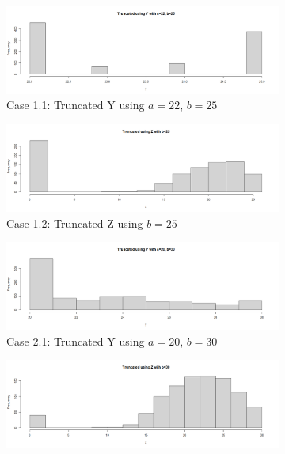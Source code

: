 \documentclass[12pt,letterpaper]{article}
\begin{document}
\begin{enumerate}[label=\Alph*]
       \begin{figure}[H]
         \centering 
         \begin{subfigure}[H]{0.49\textwidth}
           \includegraphics[width=\textwidth]{Y-22-25.png}
            \caption*{\footnotesize Case 1.1: Truncated Y using $a=22$, $b=25$}
         \end{subfigure}
         \begin{subfigure}[H]{0.49\textwidth}
          \includegraphics[width=\textwidth]{Z-25.png}
          \caption*{\footnotesize Case 1.2: Truncated Z using $b=25$}
        \end{subfigure}
        \begin{subfigure}[H]{0.49\textwidth}
          \includegraphics[width=\textwidth]{Y-20-30.png}
          \caption*{\footnotesize Case 2.1: Truncated Y using $a=20$, $b=30$}
        \end{subfigure}
        \begin{subfigure}[H]{0.49\textwidth}
          \includegraphics[width=\textwidth]{Z-30.png}

\end{subfigure}
\end{figure}
\end{enumerate}
\end{document}
